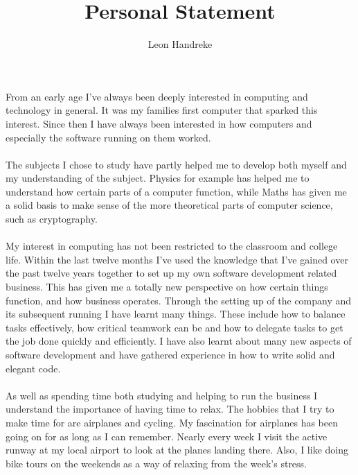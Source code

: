 \documentclass[11pt]{article}
\title{Personal Statement}
\author{Leon Handreke}
\date{}                                           %
\begin{document}
\doublespacing

\maketitle
{}\selectfont

\paragraph{}
From an early age I've always been deeply interested in computing and technology in general. It was my families first computer that sparked this interest. Since then I have always been interested in how computers and especially the software running on them worked.
\paragraph{}
The subjects I chose to study have partly helped me to develop both myself and my understanding of the subject. Physics for example has helped me to understand how certain parts of a computer function, while Maths has given me a solid basis to make sense of the more theoretical parts of computer science, such as cryptography.
\paragraph{}
My interest in computing has not been restricted to the classroom and college life. Within the last twelve months I've used the knowledge that I've gained over the past twelve years together to set up my own software development related business. This has given me a totally new perspective on how certain things function, and how business operates. Through the setting up of the company and its subsequent running I have learnt many things. These include how to balance tasks effectively, how critical teamwork can be and how to delegate tasks to get the job done quickly and efficiently. I have also learnt about many new aspects of software development and have gathered experience in how to write solid and elegant code.
\paragraph{}
As well as spending time both studying and helping to run the business I understand the importance of having time to relax. The hobbies that I try to make time for are airplanes and cycling. My fascination for airplanes has been going on for as long as I can remember. Nearly every week I visit the active runway at my local airport to look at the planes landing there. Also, I like doing bike tours on the weekends as a way of relaxing from the week's stress.
\end{document}

